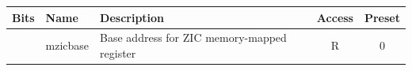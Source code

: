 \vspace{0.5cm}
\begin{table}[H]
    \label{tab:csr_mzicbase}
        \centering
        \begin{tabular}{l l p{8cm} c c}
         \hline 
         \textbf{Bits} & \textbf{Name} & \textbf{Description} & \textbf{Access} & \textbf{Preset}\\ \hline \hline
         [63:0] & mzicbase & Base address for ZIC memory-mapped register & R & 0\\ \hline
        \end{tabular}
\end{table}
\vspace{0.5cm}
